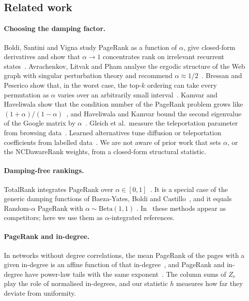 \documentclass[11pt,a4paper]{article}
\theoremstyle{definition}
\theoremstyle{remark}
\begin{document}
\subsection{Related work}
\paragraph{Choosing the damping factor.} Boldi, Santini and Vigna study PageRank as a function of
$\alpha$, give closed-form derivatives and show that $\alpha\to1$ concentrates rank on irrelevant
recurrent states~\cite{boldi05,boldi09}. Avrachenkov, Litvak and Pham analyse the ergodic structure of
the Web graph with singular perturbation theory and recommend $\alpha\approx1/2$~\cite{avrachenkov08}.
Bressan and Peserico show that, in the worst case, the top-$k$ ordering can take every permutation as
$\alpha$ varies over an arbitrarily small interval~\cite{bressan10}. Kamvar and Haveliwala show that
the condition number of the PageRank problem grows like $(1+\alpha)/(1-\alpha)$~\cite{kamvar03}, and
Haveliwala and Kamvar bound the second eigenvalue of the Google matrix by $\alpha$~\cite{haveliwala03}.
Gleich et al.\ measure the teleportation parameter from browsing data~\cite{gleich10}. Learned
alternatives tune diffusion or teleportation coefficients from labelled data~\cite{berberidis19}. We are
not aware of prior work that sets $\alpha$, or the NCDawareRank weights, from a closed-form structural
statistic.
\paragraph{Damping-free rankings.} TotalRank integrates PageRank over $\alpha\in[0,1]$~\cite{boldi05tr}.
It is a special case of the generic damping functions of Baeza-Yates, Boldi and
Castillo~\cite{baeza06}, and it equals Random-$\alpha$ PageRank with $\alpha\sim\mathrm{Beta}(1,1)$
\cite{constantine09}. In~\cite{ng13} these methods appear as competitors; here we use them as
$\alpha$-integrated references.
\paragraph{PageRank and in-degree.} In networks without degree correlations, the mean PageRank of the
pages with a given in-degree is an affine function of that in-degree~\cite{fortunato08}, and PageRank and
in-degree have power-law tails with the same exponent~\cite{litvak07}. The column sums of $Z_r$ play the
role of normalised in-degrees, and our statistic $h$ measures how far they deviate from uniformity.
\end{document}
